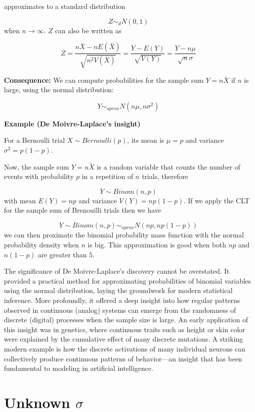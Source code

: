 \documentclass[
]{book}
\begin{document}
approximates to a standard distribution

\[Z \sim_d N(0,1)\] when \(n\rightarrow \infty\). \(Z\) can also be written as

\[Z=\frac{n\bar{X}-nE(\bar{X})}{\sqrt{n^2V(\bar{X})}}=\frac{Y-E(Y)}{\sqrt{V(Y)}}=\frac{Y-n\mu}{\sqrt{n}\sigma}\]

\textbf{Consequence:} We can compute probabilities for the sample sum \(Y=n\bar{X}\) if \(n\) is large, using the normal distribution:

\[Y \sim_{aprox}  N(n\mu, n\sigma^2)\]

\textbf{Example (De Moivre-Laplace's insight)}

For a Bernoulli trial \(X \sim Bernoulli(p)\), its mean is \(\mu=p\) and variance \(\sigma^2=p(1-p)\).

Now, the sample sum \(Y=n\bar{X}\) is a random variable that counts the number of events with probability \(p\) in a repetition of \(n\) trials, therefore

\[Y \sim Binom(n, p)\]
with mean \(E(Y)=np\) and variance \(V(Y)=np(1-p)\). If we apply the CLT for the sample sum of Brenouilli trials then we have

\[Y \sim  Binom(n, p) \sim_{aprox}  N(np, np(1-p))\]
we can then proximate the binomial probability mass function with the normal probability density when \(n\) is big. This approximation is good when both \(np\) and \(n(1-p)\) are greater than \(5\).

The significance of De Moivre-Laplace's discovery cannot be overstated. It provided a practical method for approximating probabilities of binomial variables using the normal distribution, laying the groundwork for modern statistical inference. More profoundly, it offered a deep insight into how regular patterns observed in continuous (analog) systems can emerge from the randomness of discrete (digital) processes when the sample size is large. An early application of this insight was in genetics, where continuous traits such as height or skin color were explained by the cumulative effect of many discrete mutations. A striking modern example is how the discrete activations of many individual neurons can collectively produce continuous patterns of behavior---an insight that has been fundamental to modeling in artificial intelligence.

\hypertarget{unknown-sigma}{%
\section{\texorpdfstring{Unknown \(\sigma\)}{Unknown \textbackslash sigma}}\label{unknown-sigma}}
\end{document}
